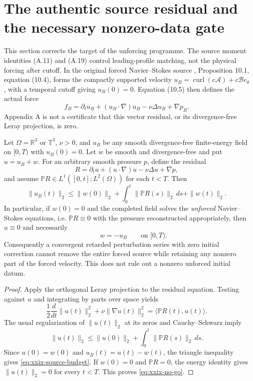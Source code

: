 
\section{The authentic source residual and the necessary nonzero-data gate}
\label{sec:source-startup-XXIX}

This section corrects the target of the unforcing programme.
The source moment identities (A.11) and (A.19) control leading-profile
matching, not the physical forcing after cutoff. In the original
forced Navier--Stokes source \cite{openai2026},
Proposition 10.1, equation (10.4), forms the compactly supported
velocity $u_B=\operatorname{curl}(c{\mathcal A})+c{\mathcal B}e_\theta$,
with a temporal cutoff giving $u_B(0)=0$. Equation (10.5)
then defines the actual force
\[
f_B=\partial_t u_B+(u_B\cdot\nabla)u_B-\nu\Delta u_B+\nabla p_B.
\]
Appendix A is not a certificate that this vector residual,
or its divergence-free Leray projection, is zero.

\begin{theorem}
\label{thm:xxix-startup}
Let $\Omega=\mathbb R^3$ or $\mathbb T^3$, $\nu>0$, and
$u_B$ be any smooth divergence-free finite-energy field
on $[0,T)$ with $u_B(0)=0$. Let $w$ be smooth
and divergence-free and put $u=u_B+w$.
For an arbitrary smooth pressure $p$, define the residual
\[
R=\partial_tu+(u\cdot\nabla)u-\nu\Delta u+\nabla p,
\]
and assume $\mathbb P R\in L^1([0,t];L^2(\Omega))$
for each $t<T$. Then
\begin{equation}\label{eq:xxix-source-budget}
\boxed{\quad
\|u_B(t)\|_2\le
\|w(0)\|_2+
\int_0^t\|\mathbb P R(s)\|_2\,ds+
\|w(t)\|_2.\quad}
\end{equation}
In particular, if $w(0)=0$ and the completed field solves
the \emph{unforced} Navier--Stokes equations, i.e.
$\mathbb P R\equiv0$ with the pressure reconstructed
appropriately, then $u\equiv0$ and necessarily
\begin{equation}\label{eq:xxix-no-go}
\boxed{\qquad w=-u_B\qquad\text{on }[0,T).}
\end{equation}
Consequently a convergent retarded perturbation series
with zero initial correction cannot remove the entire
forced source while retaining any nonzero part of
the forced velocity. This does not rule out a nonzero
unforced initial datum.
\end{theorem}
\begin{proof}
Apply the orthogonal Leray projection to the residual
equation. Testing against $u$ and integrating by parts
over space yields
\[
\frac12\frac{d}{dt}\|u(t)\|_2^2+
\nu\|\nabla u(t)\|_2^2
=\langle\mathbb P R(t),u(t)\rangle.
\]
The usual regularization of $\|u(t)\|_2$ at its zeros
and Cauchy--Schwarz imply
\[
\|u(t)\|_2\le\|u(0)\|_2+
\int_0^t\|\mathbb P R(s)\|_2\,ds.
\]
Since $u(0)=w(0)$ and
$u_B(t)=u(t)-w(t)$, the triangle inequality gives
\eqref{eq:xxix-source-budget}.
If $w(0)=0$ and $\mathbb P R=0$, the energy identity
gives $\|u(t)\|_2=0$ for every $t<T$. This proves
\eqref{eq:xxix-no-go}.
\end{proof}

